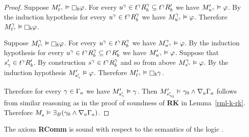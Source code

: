 \begin{proof}
Suppose $\kPModelP{\kStateT[\gamma]} \entails \necessaryB \phi$.
For every $\kStateU[\gamma] \in \kSuccessorsB[\gamma]{\kStateT[\gamma]} \subseteq \kSuccessorsPB{\kStateT[\gamma]}$ we have $\kPModelP{\kStateU[\gamma]} \entails \phi$.
By the induction hypothesis for every $\kStateU[\gamma] \in \kSuccessorsB[\gamma]{\kStateT[\gamma]}$ we have $\kPModel[\gamma]{\kStateU[\gamma]} \entails \phi$.
Therefore $\kPModel[\gamma]{\kStateT[\gamma]} \entails \necessaryB \phi$.

Suppose $\kPModel[\gamma]{\kStateT[\gamma]} \entails \necessaryB \phi$.
For every $\kStateU[\gamma] \in \kSuccessorsB[\gamma]{\kStateT[\gamma]}$ we have $\kPModel[\gamma]{\kStateU[\gamma]} \entails \phi$.
By the induction hypothesis for every $\kStateU[\gamma] \in \kSuccessorsB[\gamma]{\kStateT[\gamma]} \subseteq \kSuccessorsPB{\kStateT[\gamma]}$ we have $\kPModelP{\kStateU[\gamma]} \entails \phi$.
Suppose that $\kStateSP_\gamma \in \kSuccessorsPB{\kStateT[\gamma]}$.
By construction $\kStateS[\gamma] \in \kSuccessorsB[\gamma]{\kStateT[\gamma]}$ and so from above $\kPModel[\gamma]{\kStateS[\gamma]} \entails \phi$.
By the induction hypothesis $\kPModelP{\kStateSP_\gamma} \entails \phi$.
Therefore $\kPModelP{\kStateT[\gamma]} \entails \necessaryB \gamma$.

Therefore for every $\gamma \in \Gamma_\agentA$ we have $\kPModelP{\kStateSP_\gamma} \entails \gamma$.
Then $\kPModelP{\kStateSP_{\gamma_0}} \entails \gamma_0 \land \coversA \Gamma_\agentA$ follows from similar reasoning as in the proof of soundness of {\bf RK} in Lemma~\ref{rml-k-rk}.
Therefore $\kPModel{\kStateS} \entails \somerefsBs (\gamma_0 \land \coversA \Gamma_\agentA)$.
\end{proof}

\begin{lemma}
The axiom {\bf RComm} is sound with respect to the semantics of the logic \logicRmlS{}.
\end{lemma}

